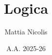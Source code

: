 \documentclass[a4paper, 12pt]{book}
\title{\textbf{Logica}}
\author{Mattia Nicolis}
\date{A.A. 2025-26}
\begin{document}
    \maketitle

    \tableofcontents
    \markboth{}{}
\end{document}
